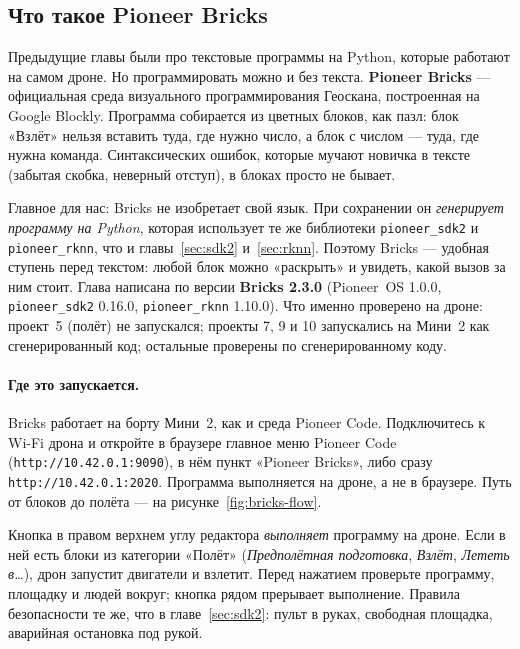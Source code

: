 \begin{center}
\end{center}

\subsection{Что такое Pioneer Bricks}

Предыдущие главы были про текстовые программы на Python, которые работают на самом дроне. Но программировать можно и без текста. \textbf{Pioneer Bricks} --- официальная среда визуального программирования Геоскана, построенная на Google Blockly. Программа собирается из цветных блоков, как пазл: блок «Взлёт» нельзя вставить туда, где нужно число, а блок с числом --- туда, где нужна команда. Синтаксических ошибок, которые мучают новичка в тексте (забытая скобка, неверный отступ), в блоках просто не бывает.

Главное для нас: Bricks не изобретает свой язык. При сохранении он \emph{генерирует программу на Python}, которая использует те же библиотеки \texttt{pioneer\_sdk2} и \texttt{pioneer\_rknn}, что и главы~\ref{sec:sdk2} и~\ref{sec:rknn}. Поэтому Bricks --- удобная ступень перед текстом: любой блок можно «раскрыть» и увидеть, какой вызов за ним стоит. Глава написана по версии \textbf{Bricks 2.3.0} (Pioneer~OS 1.0.0, \texttt{pioneer\_sdk2} 0.16.0, \texttt{pioneer\_rknn} 1.10.0). Что именно проверено на дроне: проект~5 (полёт) не запускался; проекты 7, 9 и 10 запускались на Мини~2 как сгенерированный код; остальные проверены по сгенерированному коду.

\paragraph{Где это запускается.} Bricks работает на борту Мини~2, как и среда Pioneer Code. Подключитесь к Wi-Fi дрона и откройте в браузере главное меню Pioneer Code (\texttt{http://10.42.0.1:9090}), в нём пункт «Pioneer Bricks», либо сразу \texttt{http://10.42.0.1:2020}. Программа выполняется на дроне, а не в браузере. Путь от блоков до полёта --- на рисунке~\ref{fig:bricks-flow}.



\begin{alertbox}
Кнопка  в правом верхнем углу редактора \emph{выполняет} программу на дроне. Если в ней есть блоки из категории «Полёт» (\emph{Предполётная подготовка}, \emph{Взлёт}, \emph{Лететь в…}), дрон запустит двигатели и взлетит. Перед нажатием проверьте программу, площадку и людей вокруг; кнопка  рядом прерывает выполнение. Правила безопасности те же, что в главе~\ref{sec:sdk2}: пульт в руках, свободная площадка, аварийная остановка под рукой.
\end{alertbox}

